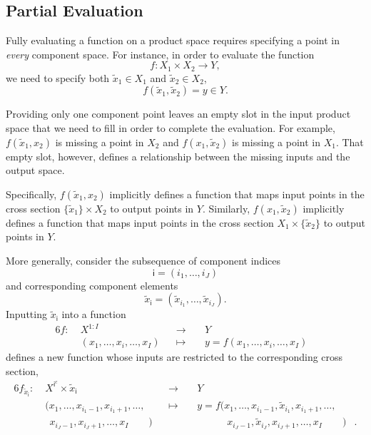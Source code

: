 \documentclass[
  letterpaper,
  DIV=11,
  numbers=noendperiod]{scrartcl}
\begin{document}
\subsection{Partial Evaluation}\label{partial-evaluation}

Fully evaluating a function on a product space requires specifying a
point in \emph{every} component space. For instance, in order to
evaluate the function \[
f: X_{1} \times X_{2} \rightarrow Y,
\] we need to specify both \(\tilde{x}_{1} \in X_{1}\) and
\(\tilde{x}_{2} \in X_{2}\), \[
f(\tilde{x}_{1}, \tilde{x}_{2}) = y \in Y.
\]

Providing only one component point leaves an empty slot in the input
product space that we need to fill in order to complete the evaluation.
For example, \(f(\tilde{x}_{1}, x_{2})\) is missing a point in \(X_{2}\)
and \(f(x_{1}, \tilde{x}_{2})\) is missing a point in \(X_{1}\). That
empty slot, however, defines a relationship between the missing inputs
and the output space.

Specifically, \(f(\tilde{x}_{1}, x_{2})\) implicitly defines a function
that maps input points in the cross section
\(\{ \tilde{x}_{1} \} \times X_{2}\) to output points in \(Y\).
Similarly, \(f(x_{1}, \tilde{x}_{2})\) implicitly defines a function
that maps input points in the cross section
\(X_{1} \times \{ \tilde{x}_{2} \}\) to output points in \(Y\).

More generally, consider the subsequence of component indices \[
\mathsf{i}
=
( i_{1}, \ldots, i_{J} )
\] and corresponding component elements \[
\tilde{x}_{ \mathsf{i} } =
( \tilde{x}_{i_{1}}, \ldots, \tilde{x}_{i_{J}} ).
\] Inputting \(\tilde{x}_{ \mathsf{i} }\) into a function
\begin{alignat*}{6}
f :\; & X^{1:I} & &\rightarrow& \; & Y &
\\
& (x_{1}, \ldots, x_{i}, \ldots, x_{I}) & &\mapsto&
& y = f(x_{1}, \ldots, x_{i}, \ldots, x_{I}) &
\end{alignat*} defines a new function whose inputs are restricted to the
corresponding cross section, \begin{alignat*}{6}
f_{ \tilde{x}_{ \mathsf{i} } } :\; &
X^{ \mathsf{i}^{c} } \times \tilde{x}_{ \mathsf{i} } &
&\rightarrow& \; & Y &
\\
& (x_{1}, \ldots, x_{i_{1} - 1}, x_{i_{1} + 1}, \ldots, & &\mapsto&
& y = f(x_{1}, \ldots, x_{i_{1} - 1}, \tilde{x}_{i_{1}}, x_{i_{1} + 1}, \ldots, &
\\
& \;\, x_{i_{J} - 1}, x_{i_{J} + 1}, \ldots, x_{I} \quad\quad) & & &
& \quad\quad\quad x_{i_{J} - 1}, \tilde{x}_{i_{J}}, x_{i_{J} + 1}, \ldots, x_{I} \quad\quad) &.
\end{alignat*}
\end{document}
